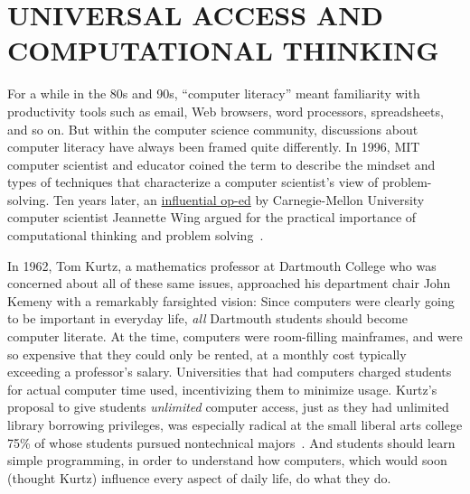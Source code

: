 
\section{UNIVERSAL ACCESS AND COMPUTATIONAL THINKING}




For a while in the 80s and 90s, ``computer literacy'' meant familiarity
with productivity tools such as email, Web browsers, word processors,
spreadsheets, and so on.
But within the computer science community, discussions about computer
literacy have always been framed quite differently.
In 1996, MIT computer scientist and educator  coined
the term  to describe the mindset and types of
techniques that characterize a computer scientist's view of
problem-solving.
Ten years later, an
\href{http://www.cs.cmu.edu/afs/cs/usr/wing/www/publications/Wing06.pdf}{influential
op-ed} by Carnegie-Mellon University computer scientist Jeannette Wing
argued for the practical importance of computational thinking and
problem solving~\cite{wing_computational_thinking}.

In 1962, Tom Kurtz, a mathematics professor at Dartmouth College who was
concerned about
all of these same issues, approached his department chair John Kemeny
with a remarkably farsighted vision: Since computers were clearly going
to be important in everyday life, \emph{all} Dartmouth students should
become computer literate.
At the time,
computers were room-filling mainframes, and were so expensive
that they could only be rented, at a monthly cost typically exceeding a
professor's salary.
Universities that had computers charged students for actual
computer time used, incentivizing them to minimize usage.
Kurtz's proposal to give students
\emph{unlimited} computer access, just as they had unlimited library borrowing privileges,
was especially radical at the small liberal arts 
college 75\% of whose students pursued nontechnical majors~\cite{goto}.
And students should learn simple programming, in order to understand
how computers, which would soon (thought Kurtz) influence every aspect
of daily life, do what they do.

